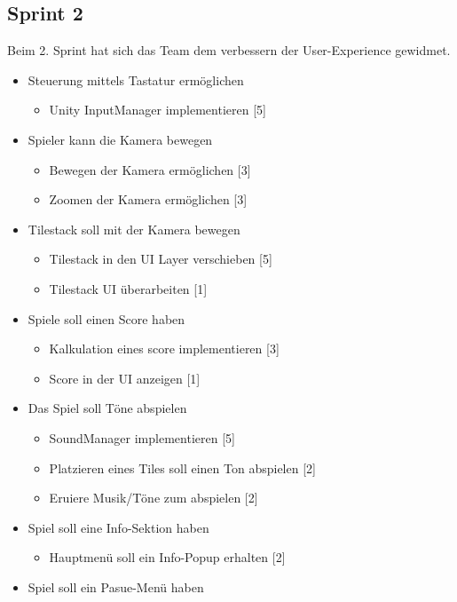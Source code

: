 \documentclass[../main.tex]{subfiles}
\begin{document}
	\newpage
	\subsection{Sprint 2}
	
	\par Beim 2. Sprint hat sich das Team dem verbessern der User-Experience gewidmet.
	
	\begin{itemize}
		\item Steuerung mittels Tastatur ermöglichen
		\begin{itemize}
			\item Unity InputManager implementieren [5]
		\end{itemize}
		\item Spieler kann die Kamera bewegen
		\begin{itemize}	
			\item Bewegen der Kamera ermöglichen [3]
			\item Zoomen der Kamera ermöglichen [3]
		\end{itemize}
		\item Tilestack soll mit der Kamera bewegen
		\begin{itemize}
			\item Tilestack in den UI Layer verschieben [5]
			\item Tilestack UI überarbeiten [1]
		\end{itemize}
		\item Spiele soll einen Score haben
		\begin{itemize}
			\item Kalkulation eines \gls{score} implementieren [3]
			\item Score in der UI anzeigen [1]
		\end{itemize}
		\item Das Spiel soll Töne abspielen
		\begin{itemize}
			\item SoundManager implementieren [5]
			\item Platzieren eines Tiles soll einen Ton abspielen [2]
			\item Eruiere Musik/Töne zum abspielen [2]
		\end{itemize}
		\item Spiel soll eine Info-Sektion haben
		\begin{itemize}
			\item Hauptmenü soll ein Info-Popup erhalten [2]
		\end{itemize}
		\item Spiel soll ein Pasue-Menü haben

\end{itemize}
\end{document}

